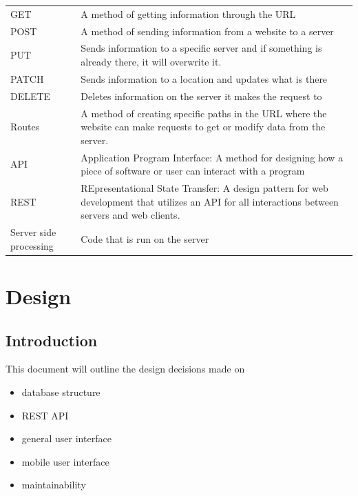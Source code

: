 \documentclass[draftclsnofoot,onecolumn,letterpaper,10pt]{IEEEtran}
\begin{document}
\begin{longtable}{p{4cm}p{12cm}}
    GET & A method of getting information through the URL \\
    POST & A method of sending information from a website to a server \\
    PUT & Sends information to a specific server and if something is already there, it will overwrite it. \\
    PATCH & Sends information to a location and updates what is there \\
    DELETE & Deletes information on the server it makes the request to \\
    Routes & A method of creating specific paths in the URL where the website can make requests to get or modify data from the server. \\
    API & Application Program Interface: A method for designing how a piece of software or user can interact with a program \\
    REST & REpresentational State Transfer: A design pattern for web development that utilizes an API for all interactions between servers and web clients. \\
    Server side processing & Code that is run on the server \\
\end{longtable}

\section{Design}
	\subsection{Introduction}
	This document will outline the design decisions made on
	\begin{itemize}
		\item database structure
		\item REST API
		\item general user interface
		\item mobile user interface
		\item maintainability
	\end{itemize}
\end{document}
